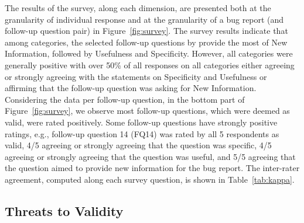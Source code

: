 The results of the survey, along each dimension, are presented both at the granularity of individual response and at the granularity of a bug report (and follow-up question pair) in Figure~\ref{fig:survey}. The survey results indicate that among categories, the selected follow-up questions by \evpi provide the most of New Information, followed by Usefulness and Specificity. However, all categories were generally positive with over 50\% of all responses on all categories either agreeing or strongly agreeing with the statements on Specificity and Usefulness or affirming that the follow-up question was asking for New Information. Considering the data per follow-up question, in the bottom part of Figure~\ref{fig:survey}, we observe most follow-up questions, which were deemed as valid, were rated positively.  Some follow-up questions have strongly positive ratings, e.g., follow-up question 14 (FQ14) was rated by all 5 respondents as valid, 4/5 agreeing or strongly agreeing that the question was specific, 4/5 agreeing or strongly agreeing that the question was useful, and 5/5 agreeing that the question aimed to provide new information for the bug report. The inter-rater agreement, computed along each survey question, is shown in Table~\ref{tab:kappa}.



\subsection{Threats to Validity}
